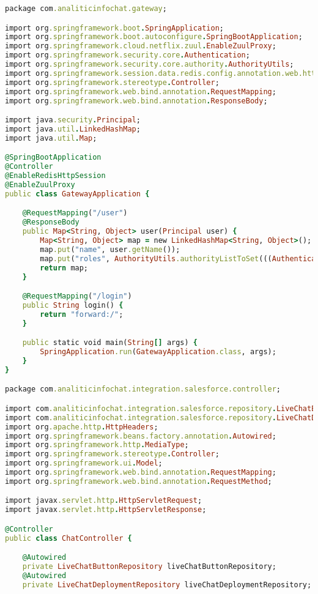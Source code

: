 \begin{lstlisting}[language=Ruby, style=rubystyle]
package com.analiticinfochat.gateway;

import org.springframework.boot.SpringApplication;
import org.springframework.boot.autoconfigure.SpringBootApplication;
import org.springframework.cloud.netflix.zuul.EnableZuulProxy;
import org.springframework.security.core.Authentication;
import org.springframework.security.core.authority.AuthorityUtils;
import org.springframework.session.data.redis.config.annotation.web.http.EnableRedisHttpSession;
import org.springframework.stereotype.Controller;
import org.springframework.web.bind.annotation.RequestMapping;
import org.springframework.web.bind.annotation.ResponseBody;

import java.security.Principal;
import java.util.LinkedHashMap;
import java.util.Map;

@SpringBootApplication
@Controller
@EnableRedisHttpSession
@EnableZuulProxy
public class GatewayApplication {

    @RequestMapping("/user")
    @ResponseBody
    public Map<String, Object> user(Principal user) {
        Map<String, Object> map = new LinkedHashMap<String, Object>();
        map.put("name", user.getName());
        map.put("roles", AuthorityUtils.authorityListToSet(((Authentication) user).getAuthorities()));
        return map;
    }

    @RequestMapping("/login")
    public String login() {
        return "forward:/";
    }

    public static void main(String[] args) {
        SpringApplication.run(GatewayApplication.class, args);
    }
}

package com.analiticinfochat.integration.salesforce.controller;

import com.analiticinfochat.integration.salesforce.repository.LiveChatButtonRepository;
import com.analiticinfochat.integration.salesforce.repository.LiveChatDeploymentRepository;
import org.apache.http.HttpHeaders;
import org.springframework.beans.factory.annotation.Autowired;
import org.springframework.http.MediaType;
import org.springframework.stereotype.Controller;
import org.springframework.ui.Model;
import org.springframework.web.bind.annotation.RequestMapping;
import org.springframework.web.bind.annotation.RequestMethod;

import javax.servlet.http.HttpServletRequest;
import javax.servlet.http.HttpServletResponse;

@Controller
public class ChatController {

    @Autowired
    private LiveChatButtonRepository liveChatButtonRepository;
    @Autowired
    private LiveChatDeploymentRepository liveChatDeploymentRepository;


\end{lstlisting}
